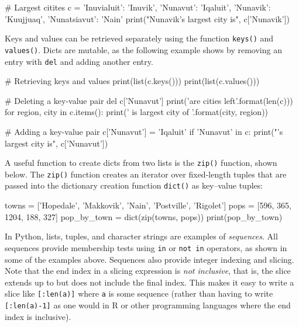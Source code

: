 \begin{samepage}
\begin{pythoncode}
# Largest citites
c = {
    'Inuvialuit': 'Inuvik',
    'Nunavut': 'Iqaluit',
    'Nunavik': 'Kuujjuaq',
    'Nunatsiavut': 'Nain' 
}
print("Nunavik's largest city is", c['Nunavik'])
\end{pythoncode}
\end{samepage}

Keys and values can be retrieved separately using the function \texttt{keys()} and \texttt{values()}. Dicts are mutable, as the following example shows by removing an entry with \texttt{del} and adding another entry.

\begin{samepage}
\begin{pythoncode}
# Retrieving keys and values
print(list(c.keys()))
print(list(c.values()))

# Deleting a key-value pair
del c['Nunavut']
print('\nThere are {} cities left\n'.format(len(c)))
for region, city in c.items():
    print('{} is largest city of {}'.format(city, region))

# Adding a key-value pair
c['Nunavut'] = 'Iqaluit'
if 'Nunavut' in c:
    print("\nNunavut's largest city is", c['Nunavut'])
\end{pythoncode}
\end{samepage}

A useful function to create dicts from two lists is the \texttt{zip()} function, shown below. The \texttt{zip()} function creates an iterator over fixed-length tuples that are passed into the dictionary creation function \texttt{dict()} as key--value tuples:

\begin{samepage}
\begin{pythoncode}
towns = ['Hopedale', 'Makkovik', 'Nain', 'Postville', 'Rigolet']
pops = [596, 365, 1204, 188, 327]
pop_by_town = dict(zip(towns, pops))
print(pop_by_town)
\end{pythoncode}
\end{samepage}

In Python, lists, tuples, and character strings are examples of \emph{sequences}. All sequences provide membership tests using \texttt{in} or \texttt{not in} operators, as shown in some of the examples above. Sequences also provide integer indexing and slicing.  Note that the end index in a slicing expression is \emph{not inclusive}, that is, the slice extends up to but does not include the final index. This makes it easy to write a slice like \texttt{[:len(a)]} where \texttt{a} is some sequence (rather than having to write \texttt{[:len(a)-1]} as one would in R or other programming languages where the end index is inclusive).

